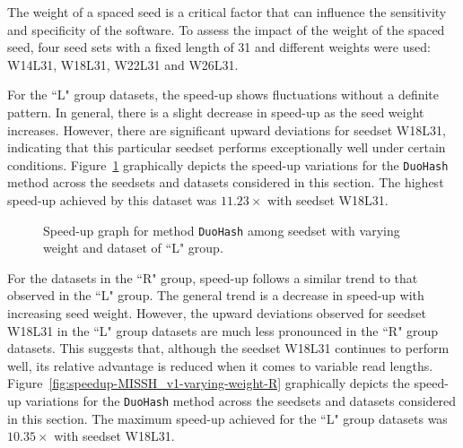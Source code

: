 	The weight of a spaced seed is a critical factor that can influence the sensitivity and specificity of the software. To assess the impact of the weight of the spaced seed, four seed sets with a fixed length of 31 and different weights were used: W14L31, W18L31, W22L31 and W26L31. 
	
	
	For the “L" group datasets, the speed-up shows fluctuations without a definite pattern. In general, there is a slight decrease in speed-up as the seed weight increases. However, there are significant upward deviations for seedset W18L31, indicating that this particular seedset performs exceptionally well under certain conditions. Figure~\ref{fig:speedup-MISSH_v1-varying-weight-L} graphically depicts the speed-up variations for the \verb|DuoHash| method across the seedsets and datasets considered in this section. The highest speed-up achieved by this dataset was $11.23\times$ with seedset W18L31.
	
	\begin{figure}[!ht]
		\centering
		\caption{Speed-up graph for method \texttt{DuoHash} among seedset with varying weight and dataset of “L" group.}
		\label{fig:speedup-MISSH_v1-varying-weight-L}
	\end{figure}
	
	
	For the datasets in the “R" group, speed-up follows a similar trend to that observed in the “L" group. The general trend is a decrease in speed-up with increasing seed weight. However, the upward deviations observed for seedset W18L31 in the “L" group datasets are much less pronounced in the “R" group datasets. This suggests that, although the seedset W18L31 continues to perform well, its relative advantage is reduced when it comes to variable read lengths. Figure~\ref{fig:speedup-MISSH_v1-varying-weight-R} graphically depicts the speed-up variations for the \verb|DuoHash| method across the seedsets and datasets considered in this section. The maximum speed-up achieved for the “L" group datasets was $10.35\times$ with seedset W18L31.
	
